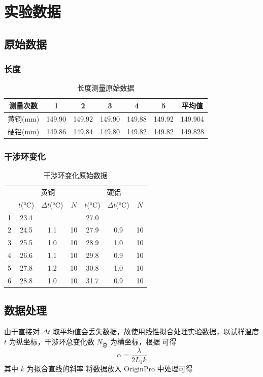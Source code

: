 \documentclass[a4paper,utf8]{article}
\begin{document}
\section{实验数据}
\subsection{原始数据}
\subsubsection{长度}
\begin{table}[!ht]
    \caption{长度测量原始数据}
    \begin{tabular}{*{7}{c}} \toprule
        测量次数 & 1 & 2 & 3 & 4 & 5 & 平均值  \\ \midrule
        黄铜(\unit{\mm}) & 149.90 & 149.92 & 149.90 & 149.88 & 149.92 & 149.904 \\ 
        硬铝(\unit{\mm}) & 149.86 & 149.84 & 149.80 & 149.82 & 149.82 & 149.828 \\ \bottomrule
    \end{tabular}
\end{table}
\subsubsection{干涉环变化}
\begin{table}[!ht]
    \caption{干涉环变化原始数据}
    \begin{tabular}{*{7}{c}}\toprule
        & \multicolumn{3}{c}{黄铜} & \multicolumn{3}{c}{硬铝} \\ 
        & $t$(\unit{\degreeCelsius}) & $\Delta t$(\unit{\degreeCelsius}) & $N$ & $t$(\unit{\degreeCelsius}) & $\Delta t$(\unit{\degreeCelsius}) & $N$  \\ \midrule
       1 & 23.4 &     &    & 27.0 &     &    \\ 
       2 & 24.5 & 1.1 & 10 & 27.9 & 0.9 & 10 \\ 
       3 & 25.5 & 1.0 & 10 & 28.9 & 1.0 & 10 \\ 
       4 & 26.6 & 1.1 & 10 & 29.8 & 0.9 & 10 \\ 
       5 & 27.8 & 1.2 & 10 & 30.8 & 1.0 & 10 \\ 
       6 & 28.8 & 1.0 & 10 & 31.7 & 0.9 & 10 \\ \bottomrule
    \end{tabular}
\end{table}
\subsection{数据处理}
由于直接对 $\Delta t$ 取平均值会丢失数据，故使用线性拟合处理实验数据，以试样温度 $t$ 为纵坐标，干涉环总变化数 $N_\text{总}$ 为横坐标，根据 可得
\begin{equation}
    \alpha = \frac{\lambda}{2 L_1 k}
\end{equation}
其中 $k$ 为拟合直线的斜率
将数据放入 OriginPro 中处理可得
\end{document}
